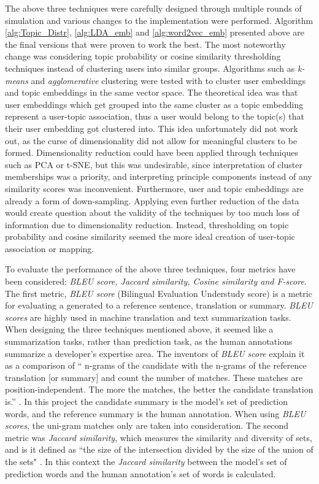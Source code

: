         The above three techniques were carefully designed through multiple rounds of simulation and various changes to the implementation were performed. Algorithm \ref{alg:Topic_Distr}, \ref{alg:LDA_emb} and \ref{alg:word2vec_emb} presented above are the final versions that were proven to work the best. The most noteworthy change was considering topic probability or cosine similarity thresholding techniques instead of clustering users into similar groups. Algorithms such as \emph{k-means} and \emph{agglomerative} clustering were tested with to cluster user embeddings and topic embeddings in the same vector space. The theoretical idea was that user embeddings which get grouped into the same cluster as a topic embedding represent a user-topic association, thus a user would belong to the topic(s) that their user embedding got clustered into. This idea unfortunately did not work out, as the curse of dimensionality did not allow for meaningful clusters to be formed. Dimensionality reduction could have been applied through techniques such as PCA or t-SNE, but this was undesirable, since interpretation of cluster memberships was a priority, and interpreting principle components instead of any similarity scores was inconvenient. Furthermore, user and topic embeddings are already a form of down-sampling. Applying even further reduction of the data would create question about the validity of the techniques by too much loss of information due to dimensionality reduction. Instead, thresholding on topic probability and cosine similarity seemed the more ideal creation of user-topic association or mapping.
        
       To evaluate the performance of the above three techniques, four metrics have been considered: \emph{BLEU score, Jaccard similarity, Cosine similarity and F-score}.
       The first metric, \emph{BLEU score} (Bilingual Evaluation Understudy score) is a metric for evaluating a generated to a reference sentence, translation or summary. \emph{BLEU scores} are highly used in machine translation and text summarization tasks. When designing the three techniques mentioned above, it seemed like a summarization tasks, rather than prediction task, as the human annotations summarize a developer's expertise area. The inventors of \emph{BLEU score} explain it as a comparison of `` n-grams of the candidate with the n-grams of the reference translation [or summary] and count the number of matches. These matches are position-independent. The more the matches, the better the candidate translation is.'' \cite{papineni2002bleu}. In this project the candidate summary is the model's set of prediction words, and the reference summary is the human annotation. When using \emph{BLEU scores}, the uni-gram matches only are taken into consideration. 
       The second metric was \emph{Jaccard similarity}, which measures the similarity and diversity of sets, and is it defined as ``the size of the intersection divided by the size of the union of the sets" \cite{jaccard_wiki}. In this context the \emph{Jaccard similarity} between the model's set of prediction words and the human annotation's set of words is calculated. 
       
